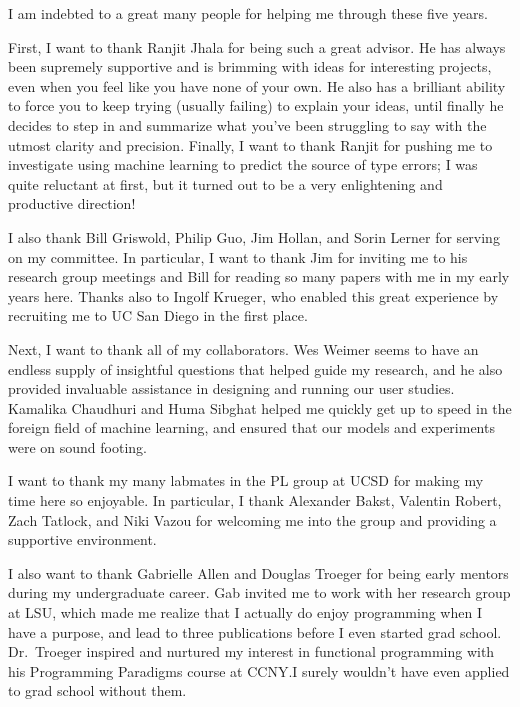 \begin{acknowledgements}
  I am indebted to a great many people for helping me through these five
  years.

  First, I want to thank Ranjit Jhala for being such a great advisor.
  He has always been supremely supportive and is brimming with ideas for
  interesting projects, even when you feel like you have none of your
  own. He also has a brilliant ability to force you to keep trying
  (usually failing) to explain your ideas, until finally he decides to
  step in and summarize what you've been struggling to say with the
  utmost clarity and precision. Finally, I want to thank Ranjit for
  pushing me to investigate using machine learning to predict the source
  of type errors; I was quite reluctant at first, but it turned out to
  be a very enlightening and productive direction!

  I also thank Bill Griswold, Philip Guo, Jim Hollan, and Sorin Lerner
  for serving on my committee. In particular, I want to thank Jim for
  inviting me to his research group meetings and Bill for reading so
  many papers with me in my early years here. Thanks also to Ingolf
  Krueger, who enabled this great experience by recruiting me to UC
  San Diego in the first place.

  Next, I want to thank all of my collaborators. Wes Weimer seems to
  have an endless supply of insightful questions that helped guide my
  research, and he also provided invaluable assistance in designing and
  running our user studies. Kamalika Chaudhuri and Huma Sibghat helped
  me quickly get up to speed in the foreign field of machine learning,
  and ensured that our models and experiments were on sound footing.

  I want to thank my many labmates in the PL group at UCSD for making my
  time here so enjoyable. In particular, I thank Alexander Bakst,
  Valentin Robert, Zach Tatlock, and Niki Vazou for welcoming me into
  the group and providing a supportive environment.

  I also want to thank Gabrielle Allen and Douglas Troeger for being
  early mentors during my undergraduate career. Gab invited me to work
  with her research group at LSU, which made me realize that I actually
  do enjoy programming when I have a purpose, and lead to three
  publications before I even started grad school. Dr.\ Troeger inspired
  and nurtured my interest in functional programming with his
  Programming Paradigms course at CCNY.\@ I surely wouldn't have even
  applied to grad school without them.


\end{acknowledgements}
